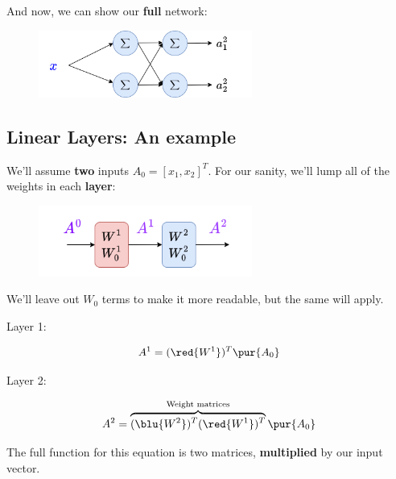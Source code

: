         And now, we can show our \textbf{full} network:
        
        \begin{figure}[H]
            \centering
            \includegraphics[width=70mm,scale=0.4]{images/nn_images/two_layers_linear.png}
        \end{figure}
        
    \subsection*{Linear Layers: An example}
        
        We'll assume \textbf{two} inputs $A_0 = [x_1, x_2]^T$. For our sanity, we'll lump all of the weights in each \textbf{layer}:
        
        \begin{figure}[H]
            \centering
            \includegraphics[width=70mm,scale=0.4]{images/nn_images/two_layer_linear_layer_view.png}
        \end{figure}
        
        We'll leave out $W_0$ terms to make it more readable, but the same will apply. 
        
        Layer 1:
        
        \begin{equation}
            A^1 = (\red{W^1})^T \pur{A_0} 
        \end{equation}
        
        Layer 2:
        
        \begin{equation}
            A^2 = 
            \overbrace{
            (\blu{W^2})^T (\red{W^1})^T
            }^{\text{Weight matrices}}
            \pur{A_0} 
        \end{equation}
        
        The full function for this equation is two matrices, \textbf{multiplied} by our input vector.
        
